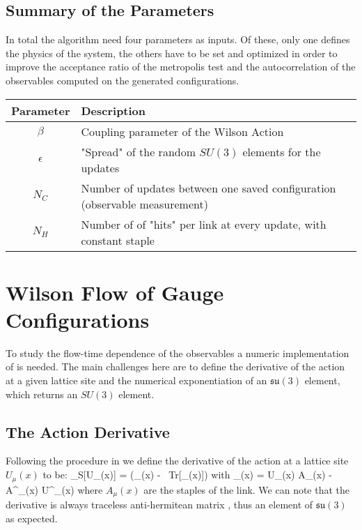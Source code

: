 \subsection{Summary of the Parameters}
In total the algorithm need four parameters as inputs. Of these, only one defines the physics of the system, the others have to be set and optimized in order to improve the acceptance ratio of the metropolis test and the autocorrelation of the observables computed on the generated configurations.

\begin{table}[!htb]
\begin{center}
\begin{tabular}{cl}
    Parameter & Description\\\hline
    $\beta$ & Coupling parameter of the Wilson Action\\
    $\epsilon$ & "Spread" of the random $SU(3)$ elements for the updates\\
    $N_C$ & Number of updates between one saved configuration (observable measurement)\\
    $N_H$ & Number of of "hits" per link at every update, with constant staple 
\end{tabular}
\label{MC:params}
\end{center}
\end{table}

\section{Wilson Flow of Gauge Configurations}
To study the flow-time dependence of the observables a numeric implementation of \LINK is needed. The main challenges here are to define the derivative of the action at a given lattice site and the numerical exponentiation of an $\mathfrak{su}(3)$ element, which returns an $SU(3)$ element.
\subsection{The Action Derivative}
Following the procedure in \CIT we define the derivative of the action at a lattice site $U_\mu(x)$ to be:
\beq
    \partial_\mu S[U_\mu(x)] = \left(\Omega_\mu(x) - \Im~Tr[\Omega_\mu(x)]\right)
\eeq
with 
\beq    
    \Omega_\mu(x) = U_\mu(x) A_\mu(x) - A^\dagger_\mu(x) U^\dagger_\mu(x)
\eeq
where $A_\mu(x)$ are the staples of the link. We can note that the derivative is always traceless anti-hermitean matrix , thus an element of $\mathfrak{su}(3)$ as expected.

